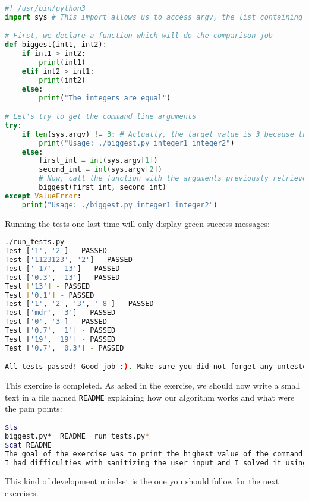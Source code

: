 \documentclass[12pt]{article}
\begin{document}
\begin{lstlisting}[style=codestyle,language=python,title=biggest.py]
#! /usr/bin/python3
import sys # This import allows us to access argv, the list containing the command line arguments

# First, we declare a function which will do the comparison job
def biggest(int1, int2):
    if int1 > int2:
        print(int1)
    elif int2 > int1:
        print(int2)
    else:
        print("The integers are equal")

# Let's try to get the command line arguments
try:
    if len(sys.argv) != 3: # Actually, the target value is 3 because the first element of argv is always the name of the script
        print("Usage: ./biggest.py integer1 integer2")
    else:
        first_int = int(sys.argv[1])
        second_int = int(sys.argv[2])
        # Now, call the function with the arguments previously retrieved
        biggest(first_int, second_int)
except ValueError:
    print("Usage: ./biggest.py integer1 integer2")
\end{lstlisting}

Running the tests one last time will only display green success messages:
\begin{lstlisting}[language=bash]
./run_tests.py 
Test ['1', '2'] - PASSED
Test ['1123123', '2'] - PASSED
Test ['-17', '13'] - PASSED
Test ['0.3', '13'] - PASSED
Test ['13'] - PASSED
Test ['0.1'] - PASSED
Test ['1', '2', '3', '-8'] - PASSED
Test ['mdr', '3'] - PASSED
Test ['0', '3'] - PASSED
Test ['0.7', '1'] - PASSED
Test ['19', '19'] - PASSED
Test ['0.7', '0.3'] - PASSED

All tests passed! Good job :). Make sure you did not forget any untested behavior
\end{lstlisting}

This exercise is completed. As asked in the exercise, we should now write a small text in a file named \texttt{README} explaining how our algorithm works and what were the pain points:

\begin{lstlisting}[language=bash]
$ls
biggest.py*  README  run_tests.py*
$cat README
The goal of the exercise was to print the highest value of the command-line arguments.
I had difficulties with sanitizing the user input and I solved it using type casting and by checking the number of arguments in argv.
\end{lstlisting}

This kind of development mindset is the one you should follow for the next exercises.
\end{document}
